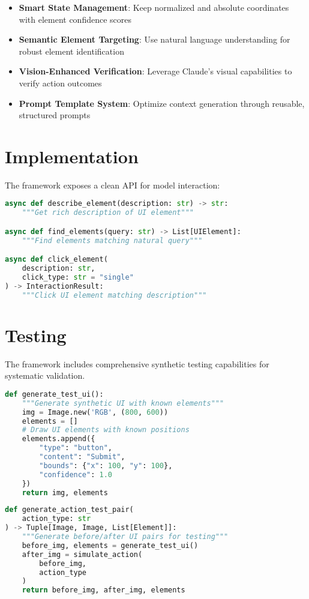 \documentclass{article}
\begin{document}
\begin{itemize}
    \item \textbf{Smart State Management}: Keep normalized and absolute coordinates with element confidence scores
    \item \textbf{Semantic Element Targeting}: Use natural language understanding for robust element identification
    \item \textbf{Vision-Enhanced Verification}: Leverage Claude's visual capabilities to verify action outcomes
    \item \textbf{Prompt Template System}: Optimize context generation through reusable, structured prompts
\end{itemize}

\section{Implementation}
The framework exposes a clean API for model interaction:

\begin{lstlisting}[language=Python]
async def describe_element(description: str) -> str:
    """Get rich description of UI element"""

async def find_elements(query: str) -> List[UIElement]:
    """Find elements matching natural query"""

async def click_element(
    description: str,
    click_type: str = "single"
) -> InteractionResult:
    """Click UI element matching description"""
\end{lstlisting}

\section{Testing}
The framework includes comprehensive synthetic testing capabilities for systematic validation.

\begin{lstlisting}[language=Python]
def generate_test_ui():
    """Generate synthetic UI with known elements"""
    img = Image.new('RGB', (800, 600))
    elements = []
    # Draw UI elements with known positions
    elements.append({
        "type": "button",
        "content": "Submit",
        "bounds": {"x": 100, "y": 100},
        "confidence": 1.0
    })
    return img, elements
\end{lstlisting}

\begin{lstlisting}[language=Python]
def generate_action_test_pair(
    action_type: str
) -> Tuple[Image, Image, List[Element]]:
    """Generate before/after UI pairs for testing"""
    before_img, elements = generate_test_ui()
    after_img = simulate_action(
        before_img, 
        action_type
    )
    return before_img, after_img, elements
\end{lstlisting}
\end{document}
